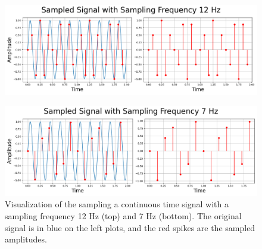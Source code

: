 \documentclass{article}
\begin{document}
\begin{figure}[H]
    \centering
    \begin{minipage}{0.8\textwidth}
        \centering
        \includegraphics[width=\linewidth]{images/sampled_12hz_3.png}
        \\[0.5em] 
    \end{minipage}
    
    \begin{minipage}{0.8\textwidth}
        \centering
        \includegraphics[width=\linewidth]{images/sampled_7hz_3.png}
    \end{minipage}
    
    \caption{Visualization of the sampling a continuous time signal with a sampling frequency 12 Hz (top) and 7 Hz (bottom). 
    The original signal is in blue on the left plots, and the red spikes are the sampled amplitudes.}
\end{figure}
    
    
\end{document}

